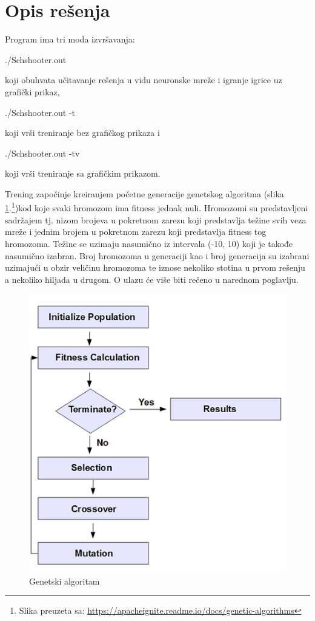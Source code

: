 \documentclass[a4paper]{article}
\begin{document}
\section{Opis rešenja}
\label{sec:opisResenja}
\par Program ima tri moda izvršavanja:
\begin{tcolorbox}
./Schshooter.out
\end{tcolorbox}
koji obuhvata učitavanje rešenja u vidu neuronske mreže i igranje igrice uz grafički prikaz,
\begin{tcolorbox}
./Schshooter.out -t
\end{tcolorbox}
koji vrši treniranje bez grafičkog prikaza i
\begin{tcolorbox}
./Schshooter.out -tv
\end{tcolorbox}
koji vrši treniranje sa grafičkim prikazom.

\newpage
\par Trening započinje kreiranjem početne generacije genetskog algoritma\cite{genetic} (slika \ref{fig:genetic}.\footnote{Slika preuzeta sa: \url{https://apacheignite.readme.io/docs/genetic-algorithms}})kod koje svaki hromozom ima fitness jednak nuli. Hromozomi su predstavljeni sadržajem tj. nizom brojeva u pokretnom zarezu koji predstavlja težine svih veza mreže i jednim brojem u pokretnom zarezu koji predstavlja fitness tog hromozoma. Težine se uzimaju nasumično iz intervala (-10, 10) koji je takođe nasumično izabran. Broj hromozoma u generaciji kao i broj generacija su izabrani uzimajući u obzir veličinu hromozoma te iznose nekoliko stotina u prvom rešenju a nekoliko hiljada u drugom. O ulazu će više biti rečeno u narednom poglavlju.

\begin{figure}[h!]
	\begin{center}
		\includegraphics[scale=0.7]{genetic.png}
	\end{center}
	\caption{Genetski algoritam}
	\label{fig:genetic}
\end{figure}
\end{document}
